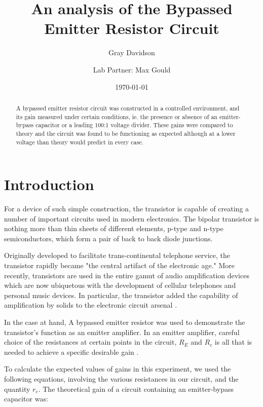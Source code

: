 \documentclass[aps,pre,twocolumn,nofootinbib]{revtex4}
\begin{document}
\title{An analysis of the Bypassed Emitter Resistor Circuit}

\author{Gray Davidson}
\author{Lab Partner: Max Gould }
\date{\today}

\begin{abstract}  
A bypassed emitter resistor circuit was constructed in a controlled environment, and its gain measured under certain conditions, ie.  the presence or absence of an emitter-bypass capacitor or a leading 100:1 voltage divider.  These gains were compared to theory and the circuit was found to be functioning as expected although at a lower voltage than theory would predict in every case.  
\end{abstract}
\maketitle



\section{Introduction}
For a device of such simple construction, the transistor is capable of creating a number of important circuits used in modern electronics.  The bipolar transistor is nothing more than thin sheets of different elements, p-type and n-type semiconductors, which form a pair of back to back diode junctions.  \cite{simpson}

Originally developed to facilitate trans-continental telephone service, the transistor rapidly became "the central artifact of the electronic age." \cite{pbs} More recently, transistors are used in the entire gamut of audio amplification devices which are now ubiquetous with the development of cellular telephones and personal music devices. \cite{corning} In particular, the transistor added the capability of amplification by solids to the electronic circuit arsenal \cite{coblenzowens}.  

In the case at hand, A bypassed emitter resistor was used to demonstrate the transistor's function as an emitter amplifier.  In an emitter amplifier, careful choice of the resistances at certain points in the circuit, $R_E$ and $R_c$ is all that is needed to achieve a specific desirable gain \cite{ecircuitcenter}.  


To calculate the expected values of gains in this experiment, we used the following equations, involving the various resistances in our circuit, and the quantity $r_e$. The theoretical gain of a circuit containing an emitter-bypass capacitor was:
\end{document}
